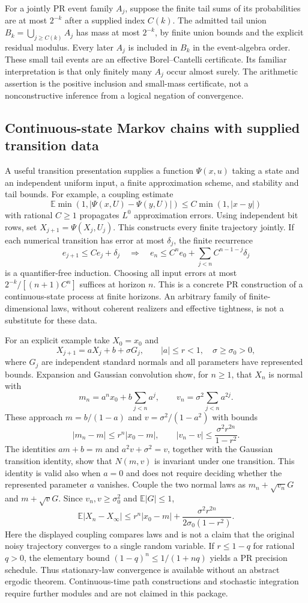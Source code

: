 For a jointly PR event family $A_j$, suppose the finite tail sums of its
probabilities are at most $2^{-k}$ after a supplied index $C(k)$.
The admitted tail union $B_k=\bigcup_{j\ge C(k)}A_j$ has mass at most
$2^{-k}$, by finite union bounds and the explicit residual modulus. Every
later $A_j$ is included in $B_k$ in the event-algebra order. These small
tail events are an effective Borel--Cantelli certificate. Its familiar
interpretation is that only finitely many $A_j$ occur almost surely. The
arithmetic assertion is the positive inclusion and small-mass certificate,
not a nonconstructive inference from a logical negation of convergence.

\subsection{Continuous-state Markov chains with supplied transition data}

A useful transition presentation supplies a function $\Psi(x,u)$ taking a
state and an independent uniform input, a finite approximation scheme, and
stability and tail bounds. For example, a coupling estimate
\[
 \mathbb E\min(1,|\Psi(x,U)-\Psi(y,U)|)
 \le C\min(1,|x-y|)
\]
with rational $C\ge1$ propagates $L^0$ approximation errors.
Using independent bit rows, set $X_{j+1}=\Psi(X_j,U_j)$. This constructs
every finite trajectory jointly. If each numerical transition has error
at most $\delta_j$, the finite recurrence
\[
 e_{j+1}\le Ce_j+\delta_j
 \quad\Longrightarrow\quad
 e_n\le C^ne_0+\sum_{j<n}C^{n-1-j}\delta_j
\]
is a quantifier-free induction. Choosing all input errors at most
$2^{-k}/[(n+1)C^n]$ suffices at horizon $n$. This is a concrete PR
construction of a continuous-state process at finite horizons. An arbitrary
family of finite-dimensional laws, without coherent realizers and effective
tightness, is not a substitute for these data.

For an explicit example take $X_0=x_0$ and
\[
 X_{j+1}=aX_j+b+\sigma G_j,
 \qquad |a|\le r<1,\quad\sigma\ge\sigma_0>0,
\]
where $G_j$ are independent standard normals and all parameters have
represented bounds. Expansion and Gaussian convolution show, for $n\ge1$,
that $X_n$ is normal with
\[
 m_n=a^nx_0+b\sum_{j<n}a^j,\qquad
 v_n=\sigma^2\sum_{j<n}a^{2j}.
\]
These approach $m=b/(1-a)$ and $v=\sigma^2/(1-a^2)$ with bounds
\[
 |m_n-m|\le r^n|x_0-m|,\qquad
 |v_n-v|\le\frac{\sigma^2r^{2n}}{1-r^2}.
\]
The identities $am+b=m$ and $a^2v+\sigma^2=v$, together with the
Gaussian transition identity, show that $N(m,v)$ is invariant under one
transition. This identity is valid also when $a=0$ and does not require
deciding whether the represented parameter $a$ vanishes.
Couple the two normal laws as $m_n+\sqrt{v_n}G$ and $m+\sqrt vG$.
Since $v_n,v\ge\sigma_0^2$ and $\mathbb E|G|\le1$,
\[
 \mathbb E|X_n-X_\infty|
 \le r^n|x_0-m|
       +\frac{\sigma^2r^{2n}}{2\sigma_0(1-r^2)}.
\]
Here the displayed coupling compares laws and is not a claim that the
original noisy trajectory converges to a single random variable.
If $r\le1-q$ for rational $q>0$, the elementary bound
$(1-q)^n\le1/(1+nq)$ yields a PR precision schedule. Thus stationary-law
convergence is available without an abstract ergodic theorem. Continuous-time
path constructions and stochastic integration require further modules and
are not claimed in this package.

